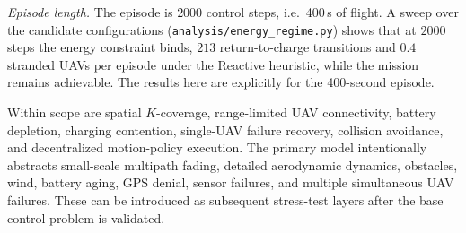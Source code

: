 \documentclass[conference]{IEEEtran}
\newcommand{\tokEpisodeSeconds}{400}
\newcommand{\tokEpisodeSteps}{2000}
\newcommand{\tokReactRet}{213}
\newcommand{\tokReactStr}{0.4}
\begin{document}
\emph{Episode length.} The episode is $\tokEpisodeSteps$ control steps, i.e.\ \tokEpisodeSeconds\,s of flight. A sweep over the candidate configurations (\texttt{analysis/energy\_regime.py}) shows that at $\tokEpisodeSteps$ steps the energy constraint binds, $\tokReactRet$ return-to-charge transitions and $\tokReactStr$ stranded UAVs per episode under the Reactive heuristic, while the mission remains achievable. The results here are explicitly for the \tokEpisodeSeconds-second episode.

Within scope are spatial $K$-coverage, range-limited UAV connectivity, battery depletion, charging contention, single-UAV failure recovery, collision avoidance, and decentralized motion-policy execution. The primary model intentionally abstracts small-scale multipath fading, detailed aerodynamic dynamics, obstacles, wind, battery aging, GPS denial, sensor failures, and multiple simultaneous UAV failures. These can be introduced as subsequent stress-test layers after the base control problem is validated.
\end{document}
